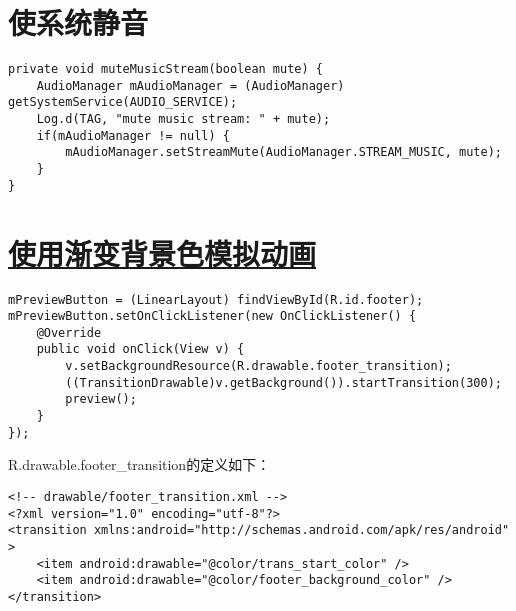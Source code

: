 ﻿\documentclass[a4paper,11pt]{article}
\begin{document}
  \section[使系统静音]{使系统静音}
  \begin{verbatim}
private void muteMusicStream(boolean mute) {
    AudioManager mAudioManager = (AudioManager) getSystemService(AUDIO_SERVICE);
    Log.d(TAG, "mute music stream: " + mute);
    if(mAudioManager != null) {
        mAudioManager.setStreamMute(AudioManager.STREAM_MUSIC, mute);
    }
}
  \end{verbatim}

  \section[使用渐变背景色模拟动画]{\underline{使用渐变背景色模拟动画}}
  \begin{verbatim}
mPreviewButton = (LinearLayout) findViewById(R.id.footer);
mPreviewButton.setOnClickListener(new OnClickListener() {
    @Override
    public void onClick(View v) {
        v.setBackgroundResource(R.drawable.footer_transition);
        ((TransitionDrawable)v.getBackground()).startTransition(300);
        preview();
    }
});
  \end{verbatim}

  R.drawable.footer\_transition的定义如下：

  \begin{verbatim}
<!-- drawable/footer_transition.xml -->
<?xml version="1.0" encoding="utf-8"?>
<transition xmlns:android="http://schemas.android.com/apk/res/android" >
    <item android:drawable="@color/trans_start_color" />
    <item android:drawable="@color/footer_background_color" />
</transition>
  \end{verbatim}

\end{document}
